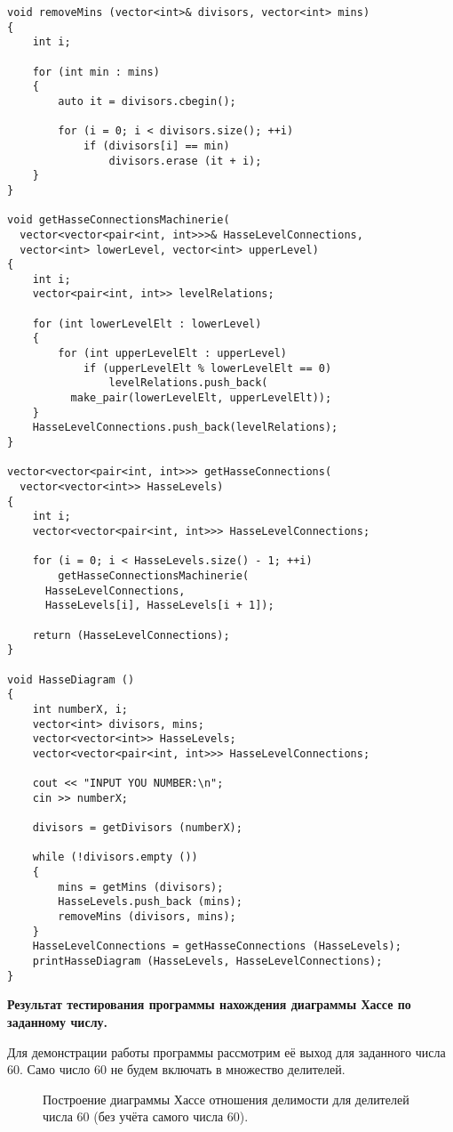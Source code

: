 \documentclass[spec, och, otchet, hidelinks]{SCWorks}
\begin{document}
\begin{lstlisting}[caption=Код программы., mathescape]
void removeMins (vector<int>& divisors, vector<int> mins)
{
	int i;

	for (int min : mins)
	{
		auto it = divisors.cbegin();

		for (i = 0; i < divisors.size(); ++i)
			if (divisors[i] == min)
				divisors.erase (it + i);
	}
}

void getHasseConnectionsMachinerie(
  vector<vector<pair<int, int>>>& HasseLevelConnections, 
  vector<int> lowerLevel, vector<int> upperLevel)
{
	int i;
	vector<pair<int, int>> levelRelations;

	for (int lowerLevelElt : lowerLevel)
	{
		for (int upperLevelElt : upperLevel)
			if (upperLevelElt % lowerLevelElt == 0)
				levelRelations.push_back(
          make_pair(lowerLevelElt, upperLevelElt));
	}
	HasseLevelConnections.push_back(levelRelations);
}

vector<vector<pair<int, int>>> getHasseConnections(
  vector<vector<int>> HasseLevels)
{
	int i;
	vector<vector<pair<int, int>>> HasseLevelConnections;

	for (i = 0; i < HasseLevels.size() - 1; ++i)
		getHasseConnectionsMachinerie(
      HasseLevelConnections, 
      HasseLevels[i], HasseLevels[i + 1]);

	return (HasseLevelConnections);
}

void HasseDiagram ()
{
	int numberX, i;
	vector<int> divisors, mins;
	vector<vector<int>> HasseLevels;
	vector<vector<pair<int, int>>> HasseLevelConnections;

	cout << "INPUT YOU NUMBER:\n";
	cin >> numberX;

	divisors = getDivisors (numberX);

	while (!divisors.empty ())
	{
		mins = getMins (divisors);
		HasseLevels.push_back (mins);
		removeMins (divisors, mins);
	}
	HasseLevelConnections = getHasseConnections (HasseLevels);
	printHasseDiagram (HasseLevels, HasseLevelConnections);
}
\end{lstlisting}

\newpage

\par \textbf{Результат тестирования программы нахождения диаграммы Хассе по
  заданному числу.}

\par Для демонстрации работы программы рассмотрим её выход для заданного числа
60. Само число 60 не будем включать в множество делителей.

\begin{figure}[h]
	\caption{Построение диаграммы Хассе отношения делимости для делителей числа 60
    (без учёта самого числа 60).}
\end{figure}
\end{document}

